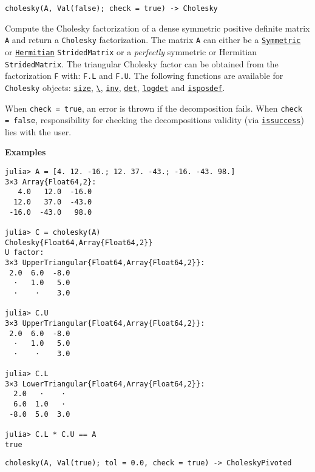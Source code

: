 \begin{adjustwidth}{2em}{0pt}


\begin{verbatim}
cholesky(A, Val(false); check = true) -> Cholesky
\end{verbatim}

Compute the Cholesky factorization of a dense symmetric positive definite matrix \texttt{A} and return a \texttt{Cholesky} factorization. The matrix \texttt{A} can either be a \hyperlink{17683454167504168761}{\texttt{Symmetric}} or \hyperlink{938713992181310063}{\texttt{Hermitian}} \texttt{StridedMatrix} or a \emph{perfectly} symmetric or Hermitian \texttt{StridedMatrix}. The triangular Cholesky factor can be obtained from the factorization \texttt{F} with: \texttt{F.L} and \texttt{F.U}. The following functions are available for \texttt{Cholesky} objects: \hyperlink{17888996102305087038}{\texttt{size}}, \hyperlink{4639577998029770435}{\texttt{{\textbackslash}}}, \hyperlink{13336866048543706848}{\texttt{inv}}, \hyperlink{16543378577000914469}{\texttt{det}}, \hyperlink{12765142073947245963}{\texttt{logdet}} and \hyperlink{13841568437070319804}{\texttt{isposdef}}.

When \texttt{check = true}, an error is thrown if the decomposition fails. When \texttt{check = false}, responsibility for checking the decomposition{\textquotesingle}s validity (via \hyperlink{10694198281534172656}{\texttt{issuccess}}) lies with the user.

\textbf{Examples}


\begin{verbatim}
julia> A = [4. 12. -16.; 12. 37. -43.; -16. -43. 98.]
3×3 Array{Float64,2}:
   4.0   12.0  -16.0
  12.0   37.0  -43.0
 -16.0  -43.0   98.0

julia> C = cholesky(A)
Cholesky{Float64,Array{Float64,2}}
U factor:
3×3 UpperTriangular{Float64,Array{Float64,2}}:
 2.0  6.0  -8.0
  ⋅   1.0   5.0
  ⋅    ⋅    3.0

julia> C.U
3×3 UpperTriangular{Float64,Array{Float64,2}}:
 2.0  6.0  -8.0
  ⋅   1.0   5.0
  ⋅    ⋅    3.0

julia> C.L
3×3 LowerTriangular{Float64,Array{Float64,2}}:
  2.0   ⋅    ⋅
  6.0  1.0   ⋅
 -8.0  5.0  3.0

julia> C.L * C.U == A
true
\end{verbatim}




\begin{lstlisting}
cholesky(A, Val(true); tol = 0.0, check = true) -> CholeskyPivoted
\end{lstlisting}


\end{adjustwidth}
